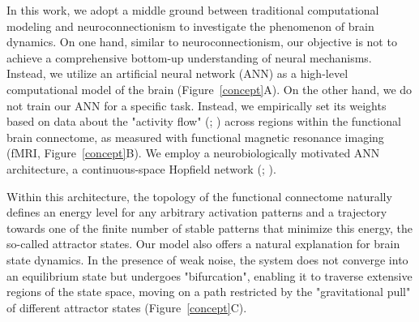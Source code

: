 \documentclass{article}
\begin{document}
In this work, we adopt a middle ground between traditional computational modeling and neuroconnectionism to investigate the phenomenon of brain dynamics.
On one hand, similar to neuroconnectionism, our objective is not to achieve a comprehensive bottom-up understanding of neural mechanisms. Instead, we utilize an artificial neural network (ANN) as a high-level computational model of the brain (Figure~\ref{concept}A).
On the other hand, we do not train our ANN for a specific task. Instead, we empirically set its weights based on  data about the "activity flow" (\cite{Cole_2016}; \href{https://doi.org/10.1038/s41467-017-01000-w}{}) across regions within the functional brain connectome, as measured with functional magnetic resonance imaging (fMRI, Figure~\ref{concept}B).
We employ a neurobiologically motivated ANN architecture, a continuous-space Hopfield network (\href{https://doi.org/10.1073/pnas.79.8.2554}{}; \cite{Krotov_2023}).

Within this architecture, the topology of the functional connectome naturally defines an energy level for any arbitrary activation patterns and a trajectory towards one of the finite number of stable patterns that minimize this energy, the so-called attractor states.
Our model also offers a natural explanation for brain state dynamics.
In the presence of weak noise, the system does not converge into an equilibrium state but undergoes "bifurcation", enabling it to traverse extensive regions of the state space, moving on a path restricted by the "gravitational pull" of different attractor states (Figure~\ref{concept}C).
\end{document}
